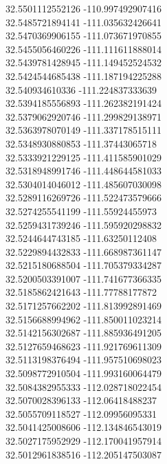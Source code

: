 {32.5501112552126	-110.997492907416\\
32.5485721894141	-111.035632426641\\
32.5470369906155	-111.073671970855\\
32.5455056460226	-111.111611888014\\
32.5439781428945	-111.149452524532\\
32.5424544685438	-111.187194225288\\
32.540934610336	-111.224837333639\\
32.5394185556893	-111.262382191424\\
32.5379062920746	-111.299829138971\\
32.5363978070149	-111.337178515111\\
32.5348930880853	-111.37443065718\\
32.5333921229125	-111.411585901029\\
32.5318948991746	-111.448644581033\\
32.5304014046012	-111.485607030098\\
32.5289116269726	-111.522473579666\\
32.5274255541199	-111.55924455973\\
32.5259431739246	-111.595920298832\\
32.5244644743185	-111.63250112408\\
32.5229894432833	-111.668987361147\\
32.5215180688504	-111.705379334287\\
32.5200503391007	-111.741677366335\\
32.5185862421643	-111.77788177872\\
32.5171257662202	-111.813992891469\\
32.5156688994962	-111.850011023214\\
32.5142156302687	-111.885936491205\\
32.5127659468623	-111.921769611309\\
32.5113198376494	-111.957510698023\\
32.5098772910504	-111.993160064479\\
32.5084382955333	-112.028718022454\\
32.5070028396133	-112.06418488237\\
32.5055709118527	-112.09956095331\\
32.5041425008606	-112.134846543019\\
32.5027175952929	-112.170041957914\\
32.5012961838516	-112.205147503087\\
}
